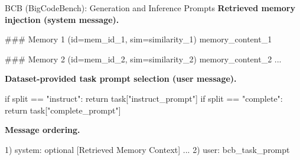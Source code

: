 \documentclass{article}
\theoremstyle{plain}
\theoremstyle{definition}
\theoremstyle{remark}
\begin{document}
\begin{PromptBox}{BCB (BigCodeBench): Generation and Inference Prompts}
\textbf{Retrieved memory injection (system message).}
\begin{PromptCode}

### Memory 1 (id={mem_id_1}, sim={similarity_1})
{memory_content_1}

### Memory 2 (id={mem_id_2}, sim={similarity_2})
{memory_content_2}
...
\end{PromptCode}
\medskip
\textbf{Dataset-provided task prompt selection (user message).}
\begin{PromptCode}
if split == "instruct":
    return task["instruct_prompt"]
if split == "complete":
    return task["complete_prompt"]
\end{PromptCode}
\medskip
\textbf{Message ordering.}
\begin{PromptCode}
1) system: optional [Retrieved Memory Context] ...
2) user: {bcb_task_prompt}
\end{PromptCode}
\end{PromptBox}
\medskip
\end{document}
